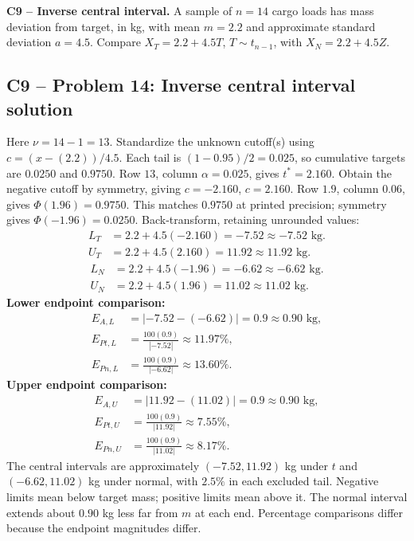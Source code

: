 {
\textbf{C9 -- Inverse central interval.} A sample of $n=14$ cargo loads has mass deviation from target, in kg, with mean $m=2.2$ and approximate standard deviation $a=4.5$. Compare $X_T=2.2+4.5T$, $T\sim t_{n-1}$, with $X_N=2.2+4.5Z$.
\label{sol:q14}
\subsection*{C9 -- Problem 14: Inverse central interval solution }
Here $\nu=14-1=13$. Standardize the unknown cutoff(s) using $c=(x-(2.2))/4.5$. Each tail is $(1-0.95)/2=0.025$, so cumulative targets are $0.0250$ and $0.9750$.
Row $13$, column $\alpha=0.025$, gives $t^*=2.160$. 
Obtain the negative cutoff by symmetry, giving $c=-2.160$, $c=2.160$.
Row $1.9$, column $0.06$, gives $\Phi(1.96)=0.9750$. This matches $0.9750$ at printed precision; symmetry gives $\Phi(-1.96)=0.0250$.
Back-transform, retaining unrounded values:
\[
\begin{aligned}
L_T&=2.2+4.5(-2.160)=-7.52\approx\boxed{-7.52\text{ kg}}.\\
U_T&=2.2+4.5(2.160)=11.92\approx\boxed{11.92\text{ kg}}.
\end{aligned}
\]
\[
\begin{aligned}
L_N&=2.2+4.5(-1.96)=-6.62\approx\boxed{-6.62\text{ kg}}.\\
U_N&=2.2+4.5(1.96)=11.02\approx\boxed{11.02\text{ kg}}.
\end{aligned}
\]
\textbf{Lower endpoint comparison:}
\[
\begin{aligned}
E_{A,L}&=|-7.52-(-6.62)|=0.9\approx\boxed{0.90\text{ kg}},\\
E_{Pt,L}&=\frac{100(0.9)}{|-7.52|}\approx\boxed{11.97\%},\\
E_{Pn,L}&=\frac{100(0.9)}{|-6.62|}\approx\boxed{13.60\%}.
\end{aligned}
\]
\textbf{Upper endpoint comparison:}
\[
\begin{aligned}
E_{A,U}&=|11.92-(11.02)|=0.9\approx\boxed{0.90\text{ kg}},\\
E_{Pt,U}&=\frac{100(0.9)}{|11.92|}\approx\boxed{7.55\%},\\
E_{Pn,U}&=\frac{100(0.9)}{|11.02|}\approx\boxed{8.17\%}.
\end{aligned}
\]
The central intervals are approximately $(-7.52,11.92)$ kg under $t$ and $(-6.62,11.02)$ kg under normal, with $2.5\%$ in each excluded tail. Negative limits mean below target mass; positive limits mean above it. The normal interval extends about $0.90$ kg less far from $m$ at each end. Percentage comparisons differ because the endpoint magnitudes differ.
\secInicio[][sec:q14]
}

